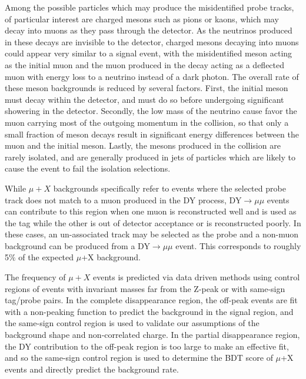 Among the possible particles which may produce the misidentified probe tracks, of particular interest are charged mesons such as pions or kaons, which may decay into muons as they pass through the detector.
As the neutrinos produced in these decays are invisible to the detector, charged mesons decaying into muons could appear very similar to a signal event, with the misidentified meson acting as the initial muon and the muon produced in the decay acting as a deflected muon with energy loss to a neutrino instead of a dark photon.
The overall rate of these meson backgrounds is reduced by several factors.
First, the initial meson must decay within the detector, and must do so before undergoing significant showering in the detector.
Secondly, the low mass of the neutrino cause favor the muon carrying most of the outgoing momentum in the collision, so that only a small fraction of meson decays result in significant energy differences between the muon and the initial meson.
Lastly, the mesons produced in the collision are rarely isolated, and are generally produced in jets of particles which are likely to cause the event to fail the isolation selections.

While $\mu+X$ backgrounds specifically refer to events where the selected probe track does not match to a muon produced in the DY process, DY$\rightarrow\mu\mu$ events can contribute to this region when one muon is reconstructed well and is used as the tag while the other is out of detector acceptance or is reconstructed poorly. 
In these cases, an un-associated track may be selected as the probe and a non-muon background can be produced from a DY$\rightarrow\mu\mu$ event. 
This corresponds to roughly 5$\%$ of the expected $\mu$+X background.

The frequency of $\mu+X$ events is predicted via data driven methods using control regions of events with invariant masses far from the Z-peak or with same-sign tag/probe pairs.
In the complete disappearance region, the off-peak events are fit with a non-peaking function to predict the background in the signal region, and the same-sign control region is used to validate our assumptions of the background shape and non-correlated charge.
In the partial disappearance region, the DY contribution to the off-peak region is too large to make an effective fit, and so the same-sign control region is used to determine the BDT score of $\mu$+X events and directly predict the background rate.

